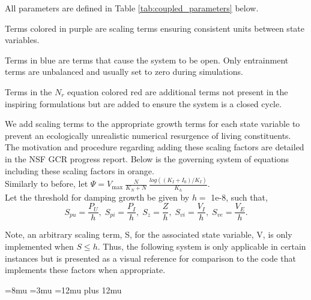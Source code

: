 \documentclass{article}
\begin{document}
\vspace{20pt}
\hspace{20pt}
\begin{minipage}{4in}
    All parameters are defined in Table \ref{tab:coupled_parameters} below.\vspace{10pt}
    
    Terms colored in {\color{Plum} purple} are scaling terms ensuring consistent units between state variables. \vspace{10pt}
    
    Terms in {\color{blue} blue} are terms that cause the system to be open. Only entrainment terms are unbalanced and usually set to zero during simulations.\vspace{10pt}
    
    Terms in the $N_r$ equation colored {\color{red} red} are additional terms not present in the inspiring formulations but are added to ensure the system is a closed cycle.
\end{minipage}


\newpage
We add scaling terms to the appropriate growth terms for each state variable to prevent an ecologically unrealistic numerical resurgence of living constituents. The motivation and procedure regarding adding these scaling factors are detailed in the NSF GCR progress report. Below is the governing system of equations including these scaling factors in \textcolor{Bittersweet}{orange}.\\

Similarly to before, let $\displaystyle \Psi = V_{\textrm{max}} \: \frac{N}{K_N + N} \: \frac{log((K_I + I_0)/K_I)}{K_{h}}.$\\

Let the threshold for damping growth be given by $h =$ 1e-8, such that,
$$S_{pu} = \frac{P_U}{h} , \; S_{pi} = \frac{P_I}{h} , \; S_{z} = \frac{Z}{h}, \; S_{vi} = \frac{V_I}{h} , \; S_{ve} = \frac{V_E}{h}. $$

Note, an arbitrary scaling term, S, for the associated state variable, V, is only implemented when $S \leq h.$ Thus, the following system is only applicable in certain instances but is presented as a visual reference for comparison to the code that implements these factors when appropriate.

\thinmuskip=8mu
\medmuskip=3mu
\thickmuskip=12mu plus 12mu
 
\end{document}

